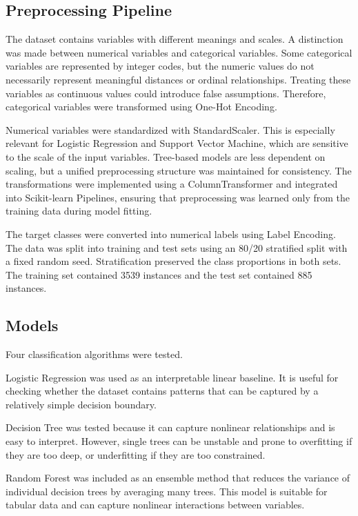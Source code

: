\documentclass[lettersize,journal]{IEEEtran}
\begin{document}
\subsection{Preprocessing Pipeline}
The dataset contains variables with different meanings and scales. A distinction was made between numerical variables and categorical variables. Some categorical variables are represented by integer codes, but the numeric values do not necessarily represent meaningful distances or ordinal relationships. Treating these variables as continuous values could introduce false assumptions. Therefore, categorical variables were transformed using One-Hot Encoding.

Numerical variables were standardized with StandardScaler. This is especially relevant for Logistic Regression and Support Vector Machine, which are sensitive to the scale of the input variables. Tree-based models are less dependent on scaling, but a unified preprocessing structure was maintained for consistency. The transformations were implemented using a ColumnTransformer and integrated into Scikit-learn Pipelines, ensuring that preprocessing was learned only from the training data during model fitting.

The target classes were converted into numerical labels using Label Encoding. The data was split into training and test sets using an 80/20 stratified split with a fixed random seed. Stratification preserved the class proportions in both sets. The training set contained 3539 instances and the test set contained 885 instances.

\subsection{Models}
Four classification algorithms were tested.

Logistic Regression was used as an interpretable linear baseline. It is useful for checking whether the dataset contains patterns that can be captured by a relatively simple decision boundary.

Decision Tree was tested because it can capture nonlinear relationships and is easy to interpret. However, single trees can be unstable and prone to overfitting if they are too deep, or underfitting if they are too constrained.

Random Forest was included as an ensemble method that reduces the variance of individual decision trees by averaging many trees. This model is suitable for tabular data and can capture nonlinear interactions between variables.
\end{document}
